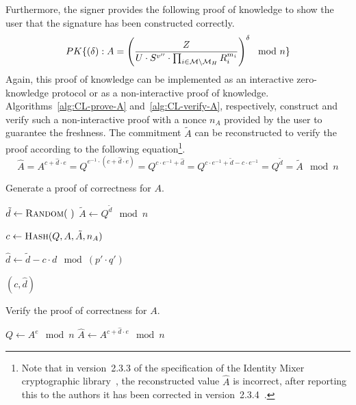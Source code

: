 Furthermore, the signer provides the following proof of knowledge to show the
user that the signature has been constructed correctly.
\begin{equation*}
  PK\{(\delta) : A = \left(\dfrac{Z}{U \cdot S^{v''} \cdot
    \prod_{i \in \mathcal{M} \setminus \mathcal{M}_H} R_i^{m_i}} \right)^{\delta} \mod n \}
\end{equation*}
Again, this proof of knowledge can be implemented as an interactive
zero-knowledge protocol or as a non-interactive proof of knowledge.
Algorithms~\ref{alg:CL-prove-A} and~\ref{alg:CL-verify-A}, respectively,
construct and verify such a non-interactive proof with a nonce $n_A$ provided by
the user to guarantee the freshness. The commitment $\tilde{A}$ can be
reconstructed to verify the proof according to the following
equation\footnote{Note that in version~2.3.3 of the specification of the
Identity Mixer cryptographic library~\cite{IdemixCrypto2011}, the reconstructed
value $\hat{A}$ is incorrect, after reporting this to the authors it has been
corrected in version~2.3.4~\cite{IdemixCrypto2012}.}.
\begin{equation*}
  \hat{A}
   = A^{c + \hat{d} \cdot e}
   = Q^{e^{-1} \cdot (c + \hat{d} \cdot e)}
   = Q^{c \cdot e^{-1} + \hat{d}}
   = Q^{c \cdot e^{-1} + \tilde{d} - c \cdot e^{-1}}
   = Q^{\tilde{d}}
   = \tilde{A} \mod n
\end{equation*}

\begin{algorithm}
  \caption{Generate a proof of correctness for $A$.}
  \label{alg:CL-prove-A}
  \addtolength{\baselineskip}{1mm}
  \begin{algorithmic}[1]
      \State $\tilde{d} \gets \Call{Random}{~}$
      \State $\tilde{A} \gets Q^{\tilde{d}} \mod n$

      \State $c \gets \Call{Hash}{Q, A, \tilde{A}, n_A}$

      \State $\hat{d} \gets \tilde{d} - c \cdot d \mod (p' \cdot q')$

      \Return $(c, \hat{d})$
    \EndFunction
  \end{algorithmic}
\end{algorithm}

\begin{algorithm}
  \caption{Verify the proof of correctness for $A$.}
  \label{alg:CL-verify-A}
  \addtolength{\baselineskip}{1mm}
  \begin{algorithmic}[1]
      \State $Q \gets A^e \mod n$
      \State $\hat{A} \gets A^{c + \hat{d} \cdot e} \mod n$

        \Return {}
      \EndIf

      \Return {}
    \EndFunction
  \end{algorithmic}
\end{algorithm}

